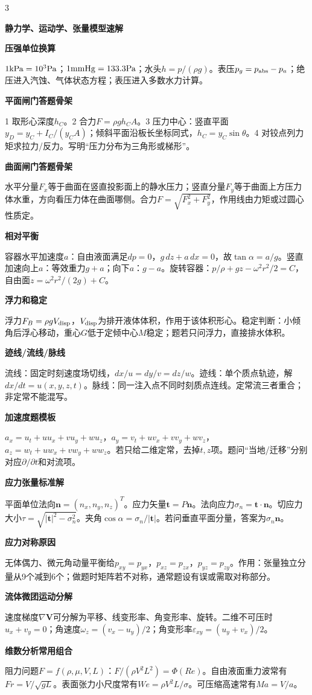 \documentclass[a4paper]{article}
\newcommand{\qt}[1]{\vspace{0.25pt}\colorbox{Q}{\parbox{\dimexpr\linewidth-2\fboxsep}{\color{white}\bfseries #1}}\par}
\newcommand{\sect}[1]{\qt{#1}}
\begin{document}
\begin{multicols}{3}
{\sect{静力学、运动学、张量模型速解}
\sect{压强单位换算}
$1{\rm kPa}=10^3{\rm Pa}$；$1{\rm mmHg}=133.3{\rm Pa}$；水头$h=p/(\rho g)$。表压$p_g=p_{\rm abs}-p_a$；绝压进入汽蚀、气体状态方程；表压进入多数水力计算。
\sect{平面闸门答题骨架}
1 取形心深度$h_C$。2 合力$F=\rho gh_CA$。3 压力中心：竖直平面$y_D=y_C+I_C/(y_CA)$；倾斜平面沿板长坐标同式，$h_C=y_C\sin\theta$。4 对铰点列力矩求拉力/反力。写明“压力分布为三角形或梯形”。
\sect{曲面闸门答题骨架}
水平分量$F_x$等于曲面在竖直投影面上的静水压力；竖直分量$F_y$等于曲面上方压力体水重，方向看压力体在曲面哪侧。合力$F=\sqrt{F_x^2+F_y^2}$，作用线由力矩或过圆心性质定。
\sect{相对平衡}
容器水平加速度$a$：自由液面满足$dp=0$，$g\,dz+a\,dx=0$，故$\tan\alpha=a/g$。竖直加速向上$a$：等效重力$g+a$；向下$a$：$g-a$。旋转容器：$p/\rho+gz-\omega^2r^2/2=C$，自由面$z=\omega^2r^2/(2g)+C$。
\sect{浮力和稳定}
浮力$F_B=\rho gV_{\rm disp}$，$V_{\rm disp}$为排开液体体积，作用于该体积形心。稳定判断：小倾角后浮心移动，重心$G$低于定倾中心$M$稳定；题若只问浮力，直接排水体积。
\sect{迹线/流线/脉线}
流线：固定时刻速度场切线，$dx/u=dy/v=dz/w$。迹线：单个质点轨迹，解$dx/dt=u(x,y,z,t)$。脉线：同一注入点不同时刻质点连线。定常流三者重合；非定常不能混写。
\sect{加速度题模板}
$a_x=u_t+uu_x+vu_y+wu_z$，$a_y=v_t+uv_x+vv_y+wv_z$，$a_z=w_t+uw_x+vw_y+ww_z$。若只给二维定常，去掉$t,z$项。题问“当地/迁移”分别对应$\partial/\partial t$和对流项。
\sect{应力张量标准解}
平面单位法向$\bm n=(n_x,n_y,n_z)^T$。应力矢量$\bm t=P\bm n$。法向应力$\sigma_n=\bm t\cdot\bm n$。切应力大小$\tau=\sqrt{|\bm t|^2-\sigma_n^2}$。夹角$\cos\alpha=\sigma_n/|\bm t|$。若问垂直平面分量，答案为$\sigma_n\bm n$。
\sect{应力对称原因}
无体偶力、微元角动量平衡给$p_{xy}=p_{yx}$，$p_{xz}=p_{zx}$，$p_{yz}=p_{zy}$。作用：张量独立分量从9个减到6个；做题时矩阵若不对称，通常题设有误或需取对称部分。
\sect{流体微团运动分解}
速度梯度$\nabla\bm V$可分解为平移、线变形率、角变形率、旋转。二维不可压时$u_x+v_y=0$；角速度$\omega_z=(v_x-u_y)/2$；角变形率$\varepsilon_{xy}=(u_y+v_x)/2$。
\sect{维数分析常用组合}
阻力问题$F=f(\rho,\mu,V,L)$：$F/(\rho V^2L^2)=\Phi(Re)$。自由液面重力波常有$Fr=V/\sqrt{gL}$。表面张力小尺度常有$We=\rho V^2L/\sigma$。可压缩高速常有$Ma=V/a$。

}
\end{multicols}
\end{document}
